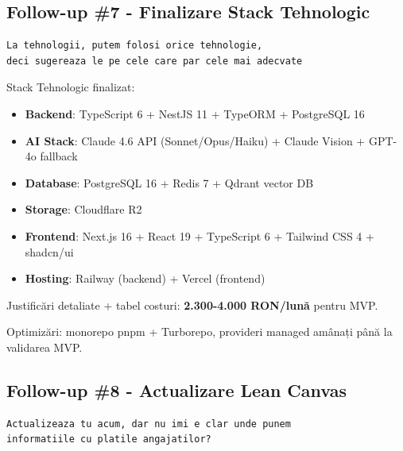 \documentclass[11pt,a4paper]{article}
\begin{document}
\subsection{Follow-up \#7 - Finalizare Stack Tehnologic}

\begin{tcolorbox}[colback=promptbackground,colframe=blue!75!black,title=Prompt Input]
\begin{verbatim}
La tehnologii, putem folosi orice tehnologie,
deci sugereaza le pe cele care par cele mai adecvate
\end{verbatim}
\end{tcolorbox}

\begin{tcolorbox}[colback=outputbackground,colframe=green!75!black,title=Output Generat]
Stack Tehnologic finalizat:
\begin{itemize}[leftmargin=*]
    \item \textbf{Backend}: TypeScript 6 + NestJS 11 + TypeORM + PostgreSQL 16
    \item \textbf{AI Stack}: Claude 4.6 API (Sonnet/Opus/Haiku) + Claude Vision + GPT-4o fallback
    \item \textbf{Database}: PostgreSQL 16 + Redis 7 + Qdrant vector DB
    \item \textbf{Storage}: Cloudflare R2
    \item \textbf{Frontend}: Next.js 16 + React 19 + TypeScript 6 + Tailwind CSS 4 + shadcn/ui
    \item \textbf{Hosting}: Railway (backend) + Vercel (frontend)
\end{itemize}

Justificări detaliate + tabel costuri: \textbf{2.300-4.000 RON/lună} pentru MVP.

Optimizări: monorepo pnpm + Turborepo, provideri managed amânați până la validarea MVP.
\end{tcolorbox}

\subsection{Follow-up \#8 - Actualizare Lean Canvas}

\begin{tcolorbox}[colback=promptbackground,colframe=blue!75!black,title=Prompt Input]
\begin{verbatim}
Actualizeaza tu acum, dar nu imi e clar unde punem
informatiile cu platile angajatilor?
\end{verbatim}
\end{tcolorbox}
\end{document}
